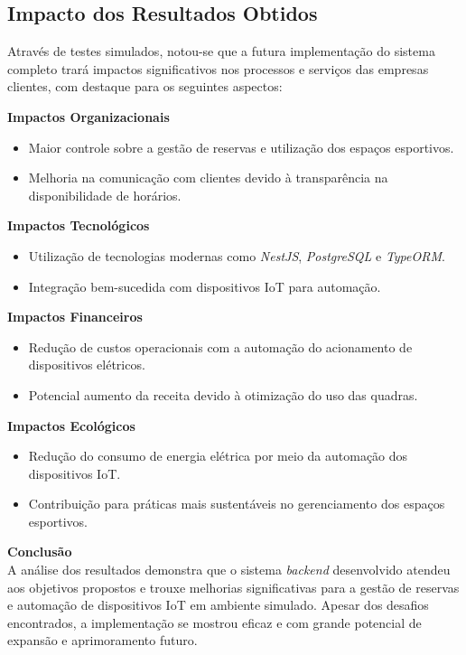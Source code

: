 \subsection{Impacto dos Resultados Obtidos}

Através de testes simulados, notou-se que a futura implementação do sistema completo trará impactos significativos nos processos e serviços das empresas clientes, com destaque para os seguintes aspectos:

\textbf{Impactos Organizacionais}\\
\begin{itemize}
    \item Maior controle sobre a gestão de reservas e utilização dos espaços esportivos.
    \item Melhoria na comunicação com clientes devido à transparência na disponibilidade de horários.
\end{itemize}

\textbf{Impactos Tecnológicos}\\
\begin{itemize}
    \item Utilização de tecnologias modernas como \textit{NestJS}, \textit{PostgreSQL} e \textit{TypeORM}.
    \item Integração bem-sucedida com dispositivos IoT para automação.
\end{itemize}

\textbf{Impactos Financeiros}\\
\begin{itemize}
    \item Redução de custos operacionais com a automação do acionamento de dispositivos elétricos.
    \item Potencial aumento da receita devido à otimização do uso das quadras.
\end{itemize}

\textbf{Impactos Ecológicos}\\
\begin{itemize}
    \item Redução do consumo de energia elétrica por meio da automação dos dispositivos IoT.
    \item Contribuição para práticas mais sustentáveis no gerenciamento dos espaços esportivos.
\end{itemize}

\noindent\textbf{Conclusão}\\
A análise dos resultados demonstra que o sistema \textit{backend} desenvolvido atendeu aos objetivos propostos e trouxe melhorias significativas para a gestão de reservas e automação de dispositivos IoT em ambiente simulado. Apesar dos desafios encontrados, a implementação se mostrou eficaz e com grande potencial de expansão e aprimoramento futuro.
